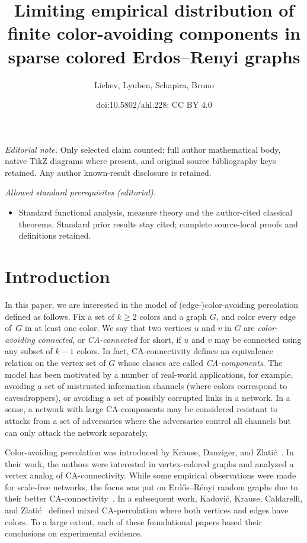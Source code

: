 \documentclass[10pt]{amsart}
\title{Limiting empirical distribution of finite color-avoiding components in sparse colored Erdos--Renyi graphs}
\author{Lichev, Lyuben, Schapira, Bruno}
\date{doi:10.5802/ahl.228; CC BY 4.0}
\theoremstyle{definition}\newtheorem{defi}[theo]{Definition}\newtheorem{rema}[theo]{Remark}\newtheorem{exam}[theo]{Example}\newtheorem{exem}[theo]{Example}\newtheorem{nota}[theo]{Notation}
\begin{document}
\maketitle
\noindent\textit{Editorial note.} Only selected claim counted; full author mathematical body, native TikZ diagrams where present, and original source bibliography keys retained. Any author known-result disclosure is retained.\par\medskip
\noindent\textit{Allowed standard prerequisites (editorial).}\begin{itemize}
\item Standard functional analysis, measure theory and the author-cited classical theorems. Standard prior results stay cited; complete source-local proofs and definitions retained.
\end{itemize}\medskip

\section{Introduction}

In this paper, we are interested in the model of (edge-)color-avoiding percolation defined as follows. Fix a set of $k\ge 2$ colors and a graph $G$, and color every edge of~$G$ in at least one color. We say that two vertices $u$ and $v$ in $G$ are \emph{color-avoiding connected}, or \emph{CA-connected} for short, if $u$ and $v$ may be connected using any subset of $k-1$ colors. In fact, CA-connectivity defines an equivalence relation on the vertex set of $G$ whose classes are called \emph{CA-components}. The model has been motivated by a number of real-world applications, for example, avoiding a set of mistrusted information channels (where colors correspond to eavesdroppers), or avoiding a set of possibly corrupted links in a network. In a sense, a network with large CA-components may be considered resistant to attacks from a set of adversaries where the adversaries control all channels but can only attack the network separately.

Color-avoiding percolation was introduced by Krause, Danziger, and Zlati\'c~\cite{KDZ16, KDZ17}. In their work, the authors were interested in vertex-colored graphs and analyzed a vertex analog of CA-connectivity. While some empirical observations were made for scale-free networks, the focus was put on Erd\H{o}s--Rényi random graphs due to their better CA-connectivity~\cite{KDZ16}. In a subsequent work, Kadovi\'c, Krause, Caldarelli, and Zlati\'c~\cite{KKCZ18} defined mixed CA-percolation where both vertices and edges have colors. To a large extent, each of these foundational papers based their conclusions on experimental evidence.
\end{document}
